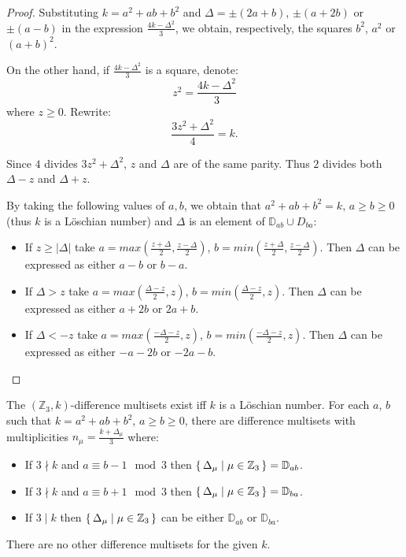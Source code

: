 \begin{proof}
	Substituting $k=a^2+ab+b^2$ and $\Delta=\pm (2a+b)$, $\pm (a+2b)$ or $\pm (a-b)$ in the expression $\frac{4k-\Delta^2}{3}$, we obtain, respectively, the squares $b^2$, $a^2$ or $(a+b)^2$.
	
	On the other hand, if $\frac{4k-\Delta^2}{3}$ is a square, denote:
	\begin{equation}
		z^2 = \frac{4k-\Delta^2}{3}
	\end{equation}
	where $z \geq 0$. Rewrite:
	\begin{equation}
		\frac{3z^2 + \Delta^2}{4} = k.
	\end{equation}
	
	Since $4$ divides $3z^2 + \Delta^2$, $z$ and $\Delta$ are of the same parity. Thus $2$ divides both $\Delta-z$ and $\Delta+z$.
	
	By taking the following values of $a,b$, we obtain that $a^2+ab+b^2=k$, $a \geq b \geq 0$ (thus $k$ is a Löschian number) and $\Delta$ is an element of $\mathbb D_{ab} \cup D_{ba}$:
	
	\begin{itemize}
		\item If $z \geq |\Delta|$ take $a=max(\frac{z+\Delta}2, \frac{z-\Delta}2)$, $b=min(\frac{z+\Delta}2, \frac{z-\Delta}2)$. Then $\Delta$ can be expressed as either $a-b$ or $b-a$.
		\item If $\Delta > z$ take $a=max(\frac{\Delta-z}{2}, z)$, $b=min(\frac{\Delta-z}{2}, z)$. Then $\Delta$ can be expressed as either $a+2b$ or $2a+b$.
		\item If $\Delta < -z$ take $a=max(\frac{-\Delta-z}2, z)$, $b=min(\frac{-\Delta-z}2, z)$. Then $\Delta$ can be expressed as either $-a-2b$ or $-2a-b$.
	\end{itemize}
	
\end{proof}

\begin{theorem}
	\label{v3:theorem:loeschian}
	The $(\mathbb Z_3,k)$-difference multisets exist iff $k$ is a Löschian number. For each $a$, $b$ such that $k=a^2+ab+b^2$, $a \geq b \geq 0$, there are difference multisets with multiplicities $n_\mu=\frac{k+\Delta_\mu}3$ where:
	
	\begin{itemize}
        \item If $3 \nmid k$ and $a \equiv b-1 \mod 3$ then $\set{\Delta_\mu | \mu \in \mathbb Z_3}=\mathbb D_{ab}$.
        \item If $3 \nmid k$ and $a \equiv b+1 \mod 3$ then $\set{\Delta_\mu | \mu \in \mathbb Z_3}=\mathbb D_{ba}$.
        \item If $3 \mid k$ then $\set{\Delta_\mu | \mu \in \mathbb Z_3}$ can be either $\mathbb D_{ab}$ or $\mathbb D_{ba}$.
	\end{itemize}
There are no other difference multisets for the given $k$.
\end{theorem}

